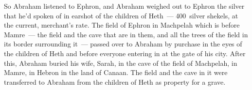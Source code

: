 \begin{inparaenum}
     So Abraham listened to Ephron, and Abraham weighed out to Ephron the silver that he'd spoken of in earshot of the children of Heth~--- 400~silver shekels, at the current, merchant's rate.%
     The field of Ephron in Machpelah which is before Mamre~--- the field and the cave that are in them, and all the trees of the field in its border surrounding it~--- passed over%
     to Abraham by purchase in the eyes of the children of Heth and before everyone entering in at the gate of his city.%
     After this, Abraham buried his wife, Sarah, in the cave of the field of Machpelah, in Mamre, in Hebron in the land of Canaan.%
     The field and the cave in it were transferred to Abraham from the children of Heth as property for a grave.%
\end{inparaenum}
